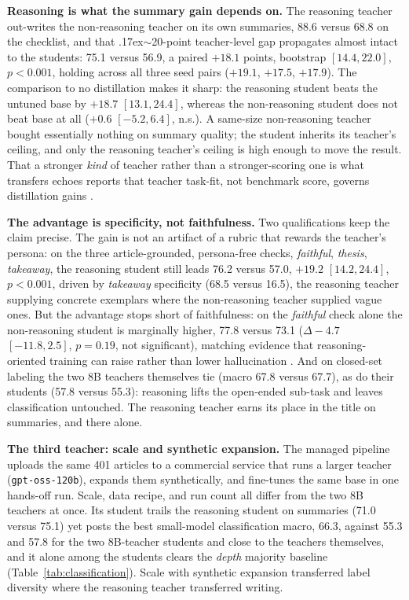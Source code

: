 \documentclass[10pt,journal]{IEEEtran}
\begin{document}
\textbf{Reasoning is what the summary gain depends on.} The reasoning teacher out-writes the non-reasoning teacher on its own summaries, 88.6 versus 68.8 on the checklist, and that {\raise.17ex\hbox{$\scriptstyle\sim$}}20-point teacher-level gap propagates almost intact to the students: 75.1 versus 56.9, a paired $+18.1$ points, bootstrap $[14.4, 22.0]$, $p<0.001$, holding across all three seed pairs ($+19.1$, $+17.5$, $+17.9$). The comparison to no distillation makes it sharp: the reasoning student beats the untuned base by $+18.7$ $[13.1, 24.4]$, whereas the non-reasoning student does not beat base at all ($+0.6$ $[-5.2, 6.4]$, n.s.). A same-size non-reasoning teacher bought essentially nothing on summary quality; the student inherits its teacher's ceiling, and only the reasoning teacher's ceiling is high enough to move the result. That a stronger \emph{kind} of teacher rather than a stronger-scoring one is what transfers echoes reports that teacher task-fit, not benchmark score, governs distillation gains \cite{chen2025factors, ramesh2025}.

\textbf{The advantage is specificity, not faithfulness.} Two qualifications keep the claim precise. The gain is not an artifact of a rubric that rewards the teacher's persona: on the three article-grounded, persona-free checks, \emph{faithful}, \emph{thesis}, \emph{takeaway}, the reasoning student still leads 76.2 versus 57.0, $+19.2$ $[14.2, 24.4]$, $p<0.001$, driven by \emph{takeaway} specificity (68.5 versus 16.5), the reasoning teacher supplying concrete exemplars where the non-reasoning teacher supplied vague ones. But the advantage stops short of faithfulness: on the \emph{faithful} check alone the non-reasoning student is marginally higher, 77.8 versus 73.1 ($\Delta-4.7$ $[-11.8, 2.5]$, $p=0.19$, not significant), matching evidence that reasoning-oriented training can raise rather than lower hallucination \cite{aggarwal2025, yao2025}. And on closed-set labeling the two 8B teachers themselves tie (macro 67.8 versus 67.7), as do their students (57.8 versus 55.3): reasoning lifts the open-ended sub-task and leaves classification untouched. The reasoning teacher earns its place in the title on summaries, and there alone.

\textbf{The third teacher: scale and synthetic expansion.}\label{sec:platform}
The managed pipeline uploads the same 401 articles to a commercial service that runs a larger teacher (\texttt{gpt-oss-120b}), expands them synthetically, and fine-tunes the same base in one hands-off run. Scale, data recipe, and run count all differ from the two 8B teachers at once. Its student trails the reasoning student on summaries (71.0 versus 75.1) yet posts the best small-model classification macro, 66.3, against 55.3 and 57.8 for the two 8B-teacher students and close to the teachers themselves, and it alone among the students clears the \emph{depth} majority baseline (Table~\ref{tab:classification}). Scale with synthetic expansion transferred label diversity where the reasoning teacher transferred writing.
\end{document}
